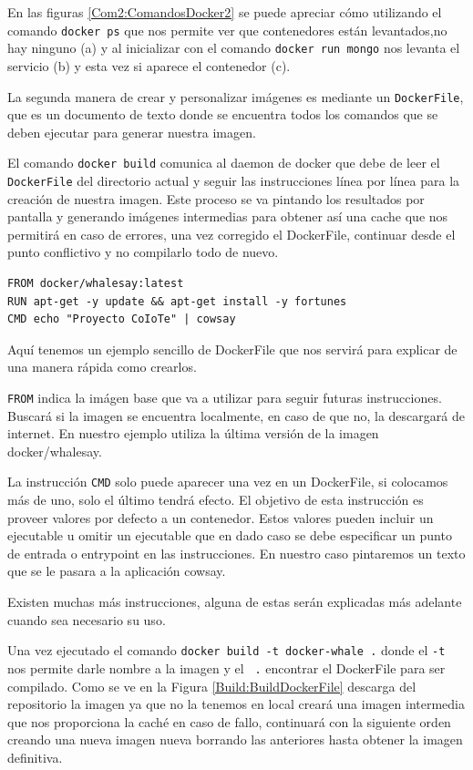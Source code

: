 En las figuras \ref{Com2:ComandosDocker2} se puede apreciar cómo utilizando el comando \texttt{docker ps} que nos permite ver que contenedores están levantados,no hay ninguno (a) y al inicializar con el comando \texttt{docker run mongo} nos levanta el servicio (b) y esta vez si aparece el contenedor (c).
\newline

La segunda manera de crear y personalizar imágenes es mediante un \texttt{DockerFile}, que es un documento de texto donde se encuentra todos los comandos que se deben ejecutar para generar nuestra imagen.

El comando \texttt{docker build} comunica al daemon de docker que debe de leer el \texttt{DockerFile} del directorio actual y seguir las instrucciones línea por línea para la creación de nuestra imagen. Este proceso se va pintando los resultados por pantalla y generando imágenes intermedias para obtener así una cache que nos permitirá en caso de errores, una vez corregido el DockerFile, continuar desde el punto conflictivo y no compilarlo todo de nuevo. 

\begin{verbatim}
FROM docker/whalesay:latest
RUN apt-get -y update && apt-get install -y fortunes
CMD echo "Proyecto CoIoTe" | cowsay
\end{verbatim}

Aquí tenemos un ejemplo sencillo de DockerFile que nos servirá para explicar de una manera rápida como crearlos. 

\texttt{FROM} indica la imágen base que va a utilizar para seguir futuras instrucciones. Buscará si la imagen se encuentra localmente, en caso de que no, la descargará de internet. En nuestro ejemplo utiliza la última versión de la imagen docker/whalesay.

La instrucción \texttt{CMD} solo puede aparecer una vez en un DockerFile, si colocamos más de uno, solo el último tendrá efecto. El objetivo de esta instrucción es proveer valores por defecto a un contenedor. Estos valores pueden incluir un ejecutable u omitir un ejecutable que en dado caso se debe especificar un punto de entrada o entrypoint en las instrucciones. En nuestro caso pintaremos un texto que se le pasara a la aplicación cowsay.

Existen muchas más instrucciones, alguna de estas serán explicadas más adelante cuando sea necesario su uso. 

Una vez ejecutado el comando \texttt{docker build -t docker-whale .} donde el \texttt{-t} nos permite darle nombre a la imagen y el \texttt{ .} encontrar el DockerFile para ser compilado. Como se ve en la Figura \ref{Build:BuildDockerFile} descarga del repositorio la imagen ya que no la tenemos en local creará una imagen intermedia que nos proporciona la caché en caso de fallo, continuará con la siguiente orden creando una nueva imagen nueva borrando las anteriores hasta obtener la imagen definitiva. 
 
